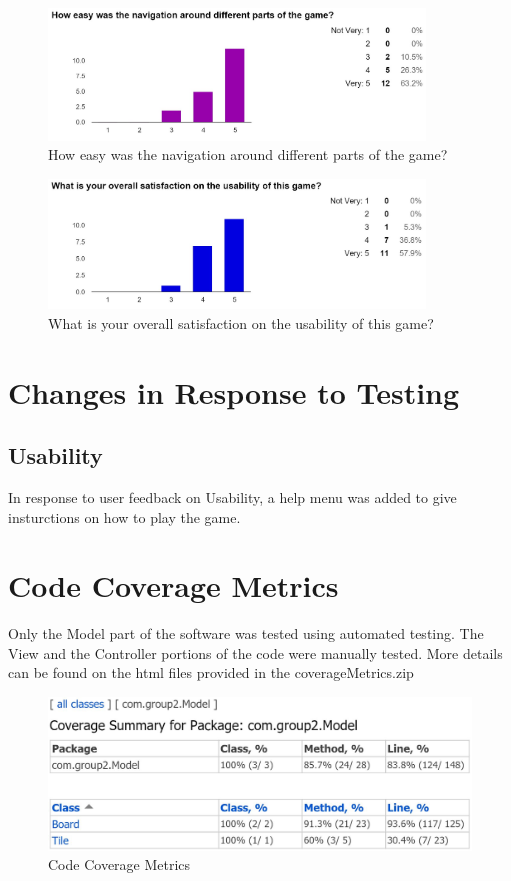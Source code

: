 \documentclass[12pt]{article}
\begin{document}
\begin{figure}[H]
	\centering
	\includegraphics[width = 10cm]{Navigation}
	\caption{How easy was the navigation around different parts of the game?}
	\label{How easy was the navigation around different parts of the game?}
\end{figure}

\begin{figure}[H]
	\centering
	\includegraphics[width = 10cm]{Overall_Satisfaction}
	\caption{What is your overall satisfaction on the usability of this game?}
	\label{What is your overall satisfaction on the usability of this game?}
\end{figure}

\section{Changes in Response to Testing}
\subsection{Usability}
In response to user feedback on Usability, a help menu was added to give insturctions on how to play the game.

\section{Code Coverage Metrics}
Only the Model part of the software was tested using automated testing. The View and the Controller portions of the code were manually tested. More details can be found on the html files provided in the coverageMetrics.zip

\begin{figure}[H]
	\centering
	\includegraphics[width = 14cm]{Code_Coverage}
	\caption{Code Coverage Metrics}
	\label{Code Coverage Metrics}
\end{figure}
\end{document}
